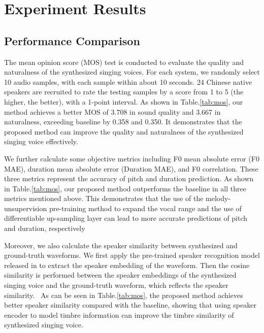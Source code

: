 \section{Experiment Results}
\label{sec:expt-rst}

\subsection{Performance Comparison}
The mean opinion score (MOS) test is conducted to evaluate the quality and naturalness of the synthesized singing voices.
For each system, we randomly select 10 audio samples, with each sample within about 10 seconds. 
24 Chinese native speakers are recruited to rate the testing samples by a score from 1 to 5 (the higher, the better), with a 1-point interval. 
As shown in Table.\ref{tab:mos}, our method achieves a better MOS of 3.708 in sound quality and 3.667 in naturalness, exceeding baseline by 0.358 and 0.350.
It demonstrates that the proposed method can improve the quality and naturalness of the synthesized singing voice effectively.

We further calculate some objective metrics including F0 mean absolute error (F0 MAE), duration mean absolute error (Duration MAE), and F0 correlation\cite{lu2020xiaoicesing}.
These three metrics represent the accuracy of pitch and duration prediction.
As shown in Table.\ref{tab:mos}, our proposed method outperforms the baseline in all three metrics mentioned above. 
This demonstrates that the use of the melody-unsupervision pre-training method to expand the vocal range and the use of differentiable up-sampling layer can lead to more accurate predictions of pitch and duration, respectively

Moreover, we also calculate the speaker similarity between synthesized and ground-truth waveforms.
We first apply the pre-trained speaker recognition model released in\cite{jia2018transfer} to extract the speaker embedding of the waveform.
Then the cosine similarity is performed between the speaker embeddings of the synthesized singing voice and the ground-truth waveform, which reflects the speaker similarity. 
As can be seen in Table.\ref{tab:mos}, the proposed method achieves better speaker similarity compared with the baseline, showing that using speaker encoder to model timbre information can improve the timbre similarity of synthesized singing voice.


